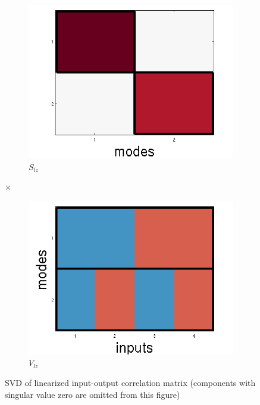 \documentclass[10pt,letterpaper]{article}
\begin{document}
\begin{figure}
\begin{subfigure}{0.22\textwidth}
\includegraphics[width=\textwidth]{figures/S_lz.png}
\caption{$S_{lz}$}
\end{subfigure}
\LARGE{$\times$}
\begin{subfigure}{0.22\textwidth}
\includegraphics[width=\textwidth]{figures/V_lz.png}
\caption{$V_{lz}$}
\end{subfigure}
\caption{SVD of linearized input-output correlation matrix (components with singular value zero are omitted from this figure)}
\label{linearized_SVD_figure}
\end{figure}
\end{document}
